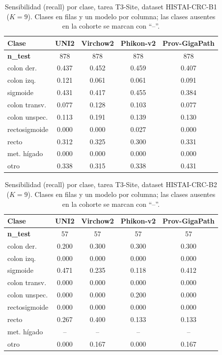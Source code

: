 \begin{table}[H]
\centering
\caption{Sensibilidad (recall) por clase, tarea T3-Site, dataset HISTAI-CRC-B1 ($K=9$). Clases en filas y un modelo por columna; las clases ausentes en la cohorte se marcan con ``--''.}
\label{tab:anexo_site_sensibilidad}
\begin{tabular}{l c c c c}
\toprule
\textbf{Clase} & \textbf{UNI2} & \textbf{Virchow2} & \textbf{Phikon-v2} & \textbf{Prov-GigaPath} \\
\midrule
\textbf{n\_test} & 878 & 878 & 878 & 878 \\
colon der. & 0.437 & 0.452 & 0.459 & 0.407 \\
colon izq. & 0.121 & 0.061 & 0.061 & 0.091 \\
sigmoide & 0.431 & 0.417 & 0.455 & 0.384 \\
colon transv. & 0.077 & 0.128 & 0.103 & 0.077 \\
colon unspec. & 0.113 & 0.191 & 0.139 & 0.130 \\
rectosigmoide & 0.000 & 0.000 & 0.027 & 0.000 \\
recto & 0.312 & 0.325 & 0.300 & 0.331 \\
met. hígado & 0.000 & 0.000 & 0.000 & 0.000 \\
otro & 0.338 & 0.315 & 0.338 & 0.431 \\
\bottomrule
\end{tabular}
\end{table}

\begin{table}[H]
\centering
\caption{Sensibilidad (recall) por clase, tarea T3-Site, dataset HISTAI-CRC-B2 ($K=9$). Clases en filas y un modelo por columna; las clases ausentes en la cohorte se marcan con ``--''.}
\label{tab:anexo_site_sensibilidad_b2}
\begin{tabular}{l c c c c}
\toprule
\textbf{Clase} & \textbf{UNI2} & \textbf{Virchow2} & \textbf{Phikon-v2} & \textbf{Prov-GigaPath} \\
\midrule
\textbf{n\_test} & 57 & 57 & 57 & 57 \\
colon der. & 0.200 & 0.300 & 0.300 & 0.300 \\
colon izq. & 0.000 & 0.000 & 0.000 & 0.000 \\
sigmoide & 0.471 & 0.235 & 0.118 & 0.412 \\
colon transv. & 0.000 & 0.000 & 0.000 & 0.000 \\
colon unspec. & 0.000 & 0.000 & 0.200 & 0.000 \\
rectosigmoide & 0.000 & 0.000 & 0.000 & 0.000 \\
recto & 0.267 & 0.400 & 0.133 & 0.133 \\
met. hígado & -- & -- & -- & -- \\
otro & 0.000 & 0.167 & 0.000 & 0.167 \\
\bottomrule
\end{tabular}
\end{table}

